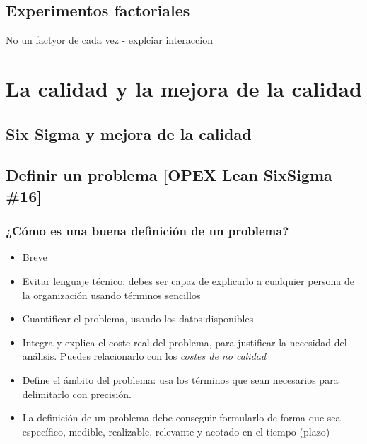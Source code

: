 \documentclass[
  letterpaper,
  DIV=11,
  numbers=noendperiod,
  oneside]{scrreprt}
\providecommand{\tightlist}{%
  \setlength{\itemsep}{0pt}\setlength{\parskip}{0pt}}\usepackage{longtable,booktabs,array}
\begin{document}
\hypertarget{experimentos-factoriales}{%
\section{Experimentos factoriales}\label{experimentos-factoriales}}

No un factyor de cada vez - explciar interaccion


\hypertarget{la-calidad-y-la-mejora-de-la-calidad}{%
\chapter{La calidad y la mejora de la
calidad}\label{la-calidad-y-la-mejora-de-la-calidad}}

\hypertarget{six-sigma-y-mejora-de-la-calidad}{%
\section{Six Sigma y mejora de la
calidad}\label{six-sigma-y-mejora-de-la-calidad}}

\hypertarget{definir-un-problema-opex-lean-sixsigma-16}{%
\section{Definir un problema {[}OPEX Lean SixSigma
\#16{]}}\label{definir-un-problema-opex-lean-sixsigma-16}}

\hypertarget{cuxf3mo-es-una-buena-definiciuxf3n-de-un-problema}{%
\subsection{¿Cómo es una buena definición de un
problema?}\label{cuxf3mo-es-una-buena-definiciuxf3n-de-un-problema}}

\begin{itemize}
\tightlist
\item
  Breve
\item
  Evitar lenguaje técnico: debes ser capaz de explicarlo a cualquier
  persona de la organización usando términos sencillos
\item
  Cuantificar el problema, usando los datos disponibles
\item
  Integra y explica el coste real del problema, para justificar la
  necesidad del análisis. Puedes relacionarlo con los \emph{costes de no
  calidad}
\item
  Define el ámbito del problema: usa los términos que sean necesarios
  para delimitarlo con precisión.
\item
  La definición de un problema debe conseguir formularlo de forma que
  sea específico, medible, realizable, relevante y acotado en el tiempo
  (plazo)
\end{itemize}
\end{document}
